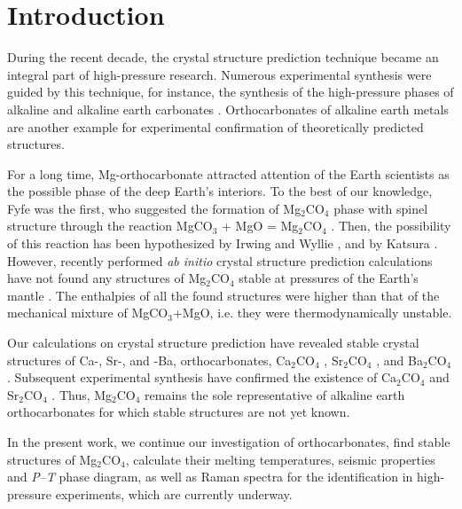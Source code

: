 \documentclass[a4paperm]{article}
\begin{document}
\section*{Introduction}

During the recent decade, the crystal structure prediction technique became an integral part of high-pressure research. 
Numerous experimental synthesis were guided by this technique, for instance, the synthesis of the high-pressure phases of alkaline \cite{gavr2016, gavr2019_alk, grzechnik2003}  and alkaline earth carbonates  \cite{oganov2006, pickard2015, gavr2017_aragII, smith2018, solomatova2017_fedol, binck2020_dol, merlini2017_dol}.
Orthocarbonates of alkaline earth metals are another example for experimental confirmation of theoretically predicted structures.

For a long time, Mg-orthocarbonate attracted attention of the Earth scientists as the possible phase of the deep Earth's interiors.
{\color{blue}
To the best of our knowledge, Fyfe was the first, who suggested the formation of Mg$_2$CO$_4$ phase  with spinel structure through the reaction MgCO$_3$ + MgO = Mg$_2$CO$_4$  \cite{fyfe1970}.
Then, the possibility of this reaction has been hypothesized by Irwing and Wyllie \cite{irving1973}, and by Katsura \cite{katsura1991_mgco3}.
}
However, recently performed {\it ab initio} crystal structure prediction calculations have not found any structures of Mg$_2$CO$_4$ stable at pressures of the Earth's mantle \cite{yao2018}.
The enthalpies of all the found structures were higher than that of the mechanical mixture of MgCO$_3$+MgO, i.e. they were thermodynamically unstable.

Our calculations on crystal structure prediction have revealed stable crystal structures of Ca-, Sr-, and -Ba, orthocarbonates, Ca$_2$CO$_4$ \cite{sagatova2020_ortho}, Sr$_2$CO$_4$ \cite{gavr2020_htxrd}, and Ba$_2$CO$_4$ \cite{gavr2020_htxrd}. 
Subsequent experimental synthesis have confirmed the existence of Ca$_2$CO$_4$ and Sr$_2$CO$_4$ \cite{laniel2021_sr2co4,binck2021_ca2co4}.
Thus, Mg$_2$CO$_4$ remains the sole representative of alkaline earth orthocarbonates for which stable structures are not yet known.

In the present work, we continue our investigation of orthocarbonates, find stable structures of Mg$_2$CO$_4$, calculate their melting temperatures, seismic properties and {\it P--T} phase diagram, as well as Raman spectra for the identification in high-pressure experiments, which are currently underway.
\end{document}
